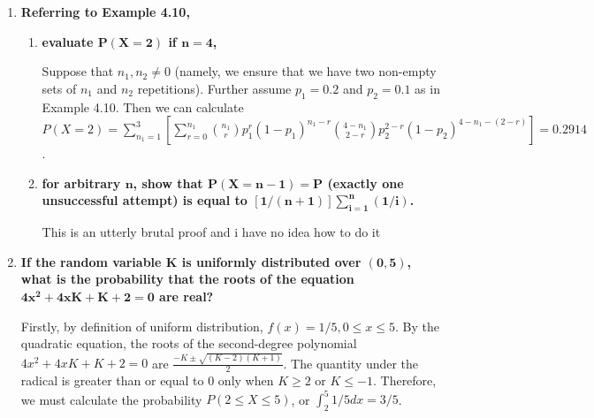 \documentclass[10pt, oneside]{article}   	%
\theoremstyle{definition}
\begin{document}
\begin{enumerate}[label=4.\arabic*]
\item  \begin{tcolorbox}[
  colback=Cerulean!5!white,
  colframe=Cerulean!75!black]
\textbf{Referring to Example 4.10,}
\end{tcolorbox}

	\begin{enumerate}
	\item  \begin{tcolorbox}[
	  colback=Cerulean!5!white,
	  colframe=Cerulean!75!black]
	\textbf{evaluate $\bm{P(X = 2)}$ if $\bm{n=4}$,}
	\end{tcolorbox}
	
	Suppose that $n_1, n_2 \neq 0$ (namely, we ensure that we have two non-empty sets of $n_1$ and $n_2$ repetitions). Further assume $p_1 = 0.2$ and $p_2 = 0.1$ as in Example 4.10. Then we can calculate $P(X = 2) = \sum^3_{n_1 = 1} [ \sum^{n_1}_{r=0} \binom{n_1}{r} p_1^r (1 - p_1)^{n_1 - r} \binom{4 - n_1}{2 - r} p_2^{2-r} (1 - p_2)^{4 - n_1 - (2-r)} ] = \boxed{0.2914}$.
	
	\item  \begin{tcolorbox}[
	  colback=Cerulean!5!white,
	  colframe=Cerulean!75!black]
	\textbf{for arbitrary $\bm{n}$, show that $\bm{P(X = n - 1) = P}$ (exactly one unsuccessful attempt) is equal to $\bm{[1 / (n+1)] \sum^n_{i=1} (1/i)}$.}
	\end{tcolorbox}
	
	This is an utterly brutal proof and i have no idea how to do it
	
	\end{enumerate}

\item  \begin{tcolorbox}[
  colback=Cerulean!5!white,
  colframe=Cerulean!75!black]
\textbf{If the random variable $\bm{K}$ is uniformly distributed over $\bm{(0,5)}$, what is the probability that the roots of the equation $\bm{4x^2 + 4xK + K + 2 = 0}$ are real?}
\end{tcolorbox}

Firstly, by definition of uniform distribution, $f(x) = 1/5, 0 \leq x \leq 5$. By the quadratic equation, the roots of the second-degree polynomial $4x^2 + 4xK + K + 2 = 0$ are $\frac{-K \pm \sqrt{(K - 2) (K + 1)}}{2}$. The quantity under the radical is greater than or equal to $0$ only when $K \geq 2$ or $K \leq -1$. Therefore, we must calculate the probability $P(2 \leq X \leq 5)$, or $\int^5_2 1/5 dx = \boxed{3/5}$. 


\end{enumerate}
\end{document}
